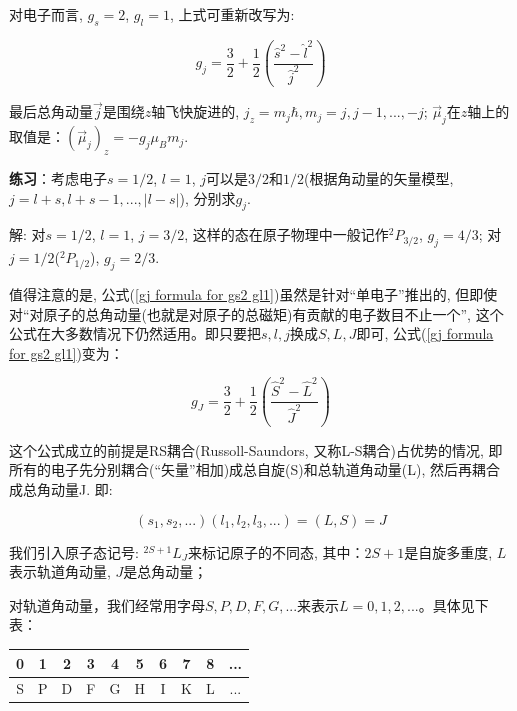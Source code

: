 对电子而言, $g_s = 2$, $g_l =1$, 上式可重新改写为:

\begin{equation}\label{gj formula for gs2 gl1}
g_j = \frac{3}{2}+\frac{1}{2}\left(\frac{\hat s^2 -\hat l^2}{\hat
j^2} \right)
\end{equation}

最后总角动量$\vec j$是围绕$z$轴飞快旋进的, $j_z = m_j \hbar, m_j =
j, j-1, ..., -j$; $\vec \mu_j$在$z$轴上的取值是：$(\vec \mu_j )_z =
-g_j \mu_B m_j$.

\textbf{练习}：考虑电子$s=1/2$, $l=1$,
$j$可以是$3/2$和$1/2$(根据角动量的矢量模型, $j = l+s, l+s-1,...,
|l-s|$), 分别求$g_j$.

解: 对$s=1/2$, $l=1$, $j=3/2$,
这样的态在原子物理中一般记作${}^2P_{3/2}$, $g_j = 4/3$;
对$j=1/2$(${}^2P_{1/2}$), $g_j = 2/3$.

值得注意的是, 公式(\ref{gj formula for gs2
gl1})虽然是针对``单电子''推出的,
但即使对``对原子的总角动量(也就是对原子的总磁矩)有贡献的电子数目不止一个'',
这个公式在大多数情况下仍然适用。即只要把$s, l, j$换成$S, L, J$即可,
公式(\ref{gj formula for gs2 gl1})变为：


\begin{equation*}
g_J = \frac{3}{2}+\frac{1}{2}\left(\frac{\hat S^2 -\hat L^2}{\hat
J^2} \right)
\end{equation*}

这个公式成立的前提是RS耦合(Russoll-Saundors,
又称L-S耦合)占优势的情况,
即所有的电子先分别耦合(``矢量''相加)成总自旋(S)和总轨道角动量(L),
然后再耦合成总角动量J. 即:

\begin{equation*}
\left(s_1,s_2,...  \right)\left(l_1,l_2,l_3,...
\right)=\left(L,S\right)=J
\end{equation*}


我们引入原子态记号: ${}^{2S+1}L_J$来标记原子的不同态,
其中：$2S+1$是自旋多重度,
  $L$表示轨道角动量, $J$是总角动量；

对轨道角动量，我们经常用字母$S, P, D, F, G, ...$来表示$L =
0,1,2,...$。具体见下表：


\begin{center}
\begin{tabular}{|c|c|c|c|c|c|c|c|c|c|}
  \hline
  0 & 1 & 2 & 3 & 4 & 5 & 6 & 7 & 8 & ... \\
  \hline
  S & P & D & F & G & H & I & K & L & ... \\
  \hline
\end{tabular}
\end{center}



